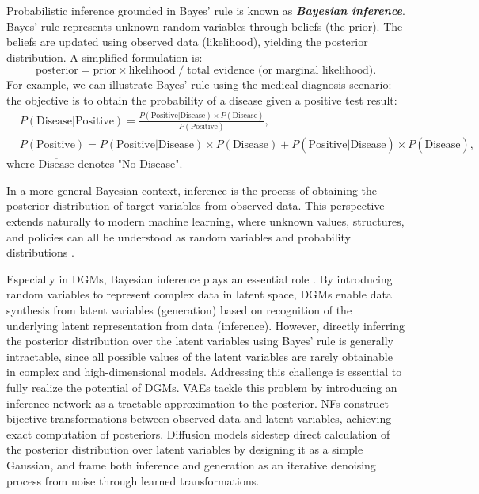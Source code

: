 Probabilistic inference grounded in Bayes' rule is known as {\bfseries\itshape Bayesian inference}. Bayes' rule represents unknown random variables through beliefs (the prior). The beliefs are updated using observed data (likelihood), yielding the posterior distribution. A simplified formulation is:
\begin{equation*}
    \label{eq:bayes_sim}
    \text{posterior} = \text{prior}\times \text{likelihood} \;/\; \text{total evidence (or marginal likelihood)}.
\end{equation*}
For example, we can illustrate Bayes' rule using the medical diagnosis scenario: the objective is to obtain the probability of a disease given a positive test result:
\begin{align*}
& P(\text{Disease} | \text{Positive}) = \frac{P(\text{Positive} | \text{Disease}) \times P(\text{Disease})}{P(\text{Positive})},\\
& P(\text{Positive}) = P(\text{Positive} | \text{Disease}) \times P(\text{Disease}) + P(\text{Positive} | \overline{\text{Disease}}) \times P(\overline{\text{Disease}}),
\end{align*}
where $\overline{\text{Disease}}$ denotes "No Disease".

In a more general Bayesian context, inference is the process of obtaining the posterior distribution of target variables from observed data. This perspective extends naturally to modern machine learning, where unknown values, structures, and policies can all be understood as random variables and probability distributions \citep{pml1Book}.

Especially in \acfp{DGM}, Bayesian inference plays an essential role \citep{pml2Book}. By introducing random variables to represent complex data in latent space, \acp{DGM} enable data synthesis from latent variables (generation) based on recognition of the underlying latent representation from data (inference). However, directly inferring the posterior distribution over the latent variables using Bayes' rule is generally intractable, since all possible values of the latent variables are rarely obtainable in complex and high-dimensional models. Addressing this challenge is essential to fully realize the potential of \acp{DGM}. \acfp{VAE} \citep{Kingma_2019} tackle this problem by introducing an inference network as a tractable approximation to the posterior. \acfp{NF} \citep{rezende2016} construct bijective transformations between observed data and latent variables, achieving exact computation of posteriors. Diffusion models \citep{ho2020ddpm} sidestep direct calculation of the posterior distribution over latent variables by designing it as a simple Gaussian, and frame both inference and generation as an iterative denoising process from noise through learned transformations.


